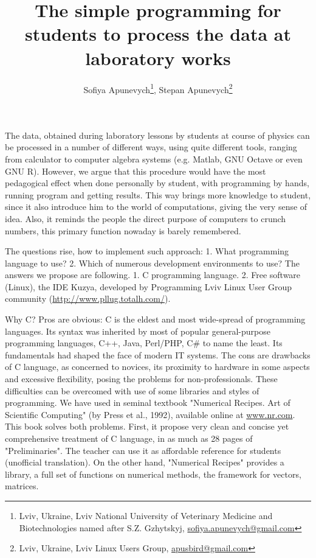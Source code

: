 \documentclass[10pt, a5paper]{article}
\begin{document}
\title{The simple programming for students to process the data at laboratory works}
\author{Sofiya Apunevych\footnote{Lviv, Ukraine, Lviv National University of Veterinary Medicine and Biotechnologies named after S.Z. Gzhytskyj, \url{sofiya.apunevych@gmail.com}}, Stepan Apunevych\footnote{Lviv, Ukraine, Lviv Linux Users Group, \url{apusbird@gmail.com}}}
\date{}
\maketitle

The data, obtained during laboratory lessons by students at course of physics can be processed in a number of different ways, using quite different tools, ranging from calculator to computer algebra systems (e.g. Matlab, GNU Octave or even GNU R). However, we argue that this procedure would have the most pedagogical effect when done personally by student, with programming by hands, running program and getting results. This way brings more knowledge to student, since it also introduce him to the world of computations, giving the very sense of idea. Also, it reminds the people the direct purpose of computers to crunch numbers, this primary function nowaday is barely remembered.

The questions rise, how to implement such approach: 1. What programming language to use? 2. Which of numerous development environments to use?
The answers we propose are following. 1. C programming language. 2. Free software (Linux), the IDE Kuzya, developed by Programming Lviv Linux User Group community (\url{http://www.pllug.totalh.com/}). 

Why C? Pros are obvious: C is the eldest and most wide-spread of programming languages. Its syntax was inherited by most of popular general-purpose programming languages, C++, Java, Perl/PHP, C\#  to name the least. Its fundamentals had shaped the face of modern IT systems. The cons are drawbacks of C language, as concerned to novices, its proximity to hardware in some aspects and excessive flexibility, posing the problems for non-professionals. These difficulties can be overcomed with use of some libraries and styles of programming. We have used in seminal textbook "Numerical Recipes. Art of Scientific Computing" (by Press et al., 1992), available online at \url{www.nr.com}. This book solves both problems. First, it propose very clean and  concise yet comprehensive treatment of C language, in as much as 28 pages of "Preliminaries". The teacher can use it as affordable reference for students (unofficial translation). On the other hand, "Numerical Recipes" provides a library, a full set of functions on numerical methods, the framework for vectors, matrices.
\end{document}
